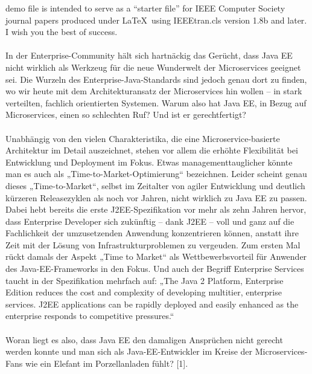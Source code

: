  demo file is intended to serve as a ``starter file''
for IEEE Computer Society journal papers produced under \LaTeX\ using
IEEEtran.cls version 1.8b and later. I wish you the best of success.\\ \\
In der Enterprise-Community hält sich hartnäckig das Gerücht, dass Java EE nicht wirklich als Werkzeug für die neue Wunderwelt der Microservices geeignet sei. Die Wurzeln des Enterprise-Java-Standards sind jedoch genau dort zu finden, wo wir heute mit dem Architekturansatz der Microservices hin wollen – in stark verteilten, fachlich orientierten Systemen. Warum also hat Java EE, in Bezug auf Microservices, einen so schlechten Ruf? Und ist er gerechtfertigt? \\ \\
Unabhängig von den vielen Charakteristika, die eine Microservice-basierte Architektur im Detail auszeichnet, stehen vor allem die erhöhte Flexibilität bei Entwicklung und Deployment im Fokus. Etwas managementtauglicher könnte man es auch als „Time-to-Market-Optimierung“ bezeichnen. Leider scheint genau dieses „Time-to-Market“, selbst im Zeitalter von agiler Entwicklung und deutlich kürzeren Releasezyklen als noch vor Jahren, nicht wirklich zu Java EE zu passen. Dabei hebt bereits die erste J2EE-Spezifikation vor mehr als zehn Jahren hervor, dass Enterprise Developer sich zukünftig – dank J2EE – voll und ganz auf die Fachlichkeit der umzusetzenden Anwendung konzentrieren können, anstatt ihre Zeit mit der Lösung von Infrastrukturproblemen zu vergeuden. Zum ersten Mal rückt damals der Aspekt „Time to Market“ als Wettbewerbsvorteil für Anwender des Java-EE-Frameworks in den Fokus. Und auch der Begriff Enterprise Services taucht in der Spezifikation mehrfach auf: „The Java 2 Platform, Enterprise Edition reduces the cost and complexity of developing multitier, enterprise services. J2EE applications can be rapidly deployed and easily enhanced as the enterprise responds to competitive pressures.“ \\ \\
Woran liegt es also, dass Java EE den damaligen Ansprüchen nicht gerecht werden konnte und man sich als Java-EE-Entwickler im Kreise der Microservices-Fans wie ein Elefant im Porzellanladen fühlt? [1].\\ \\
